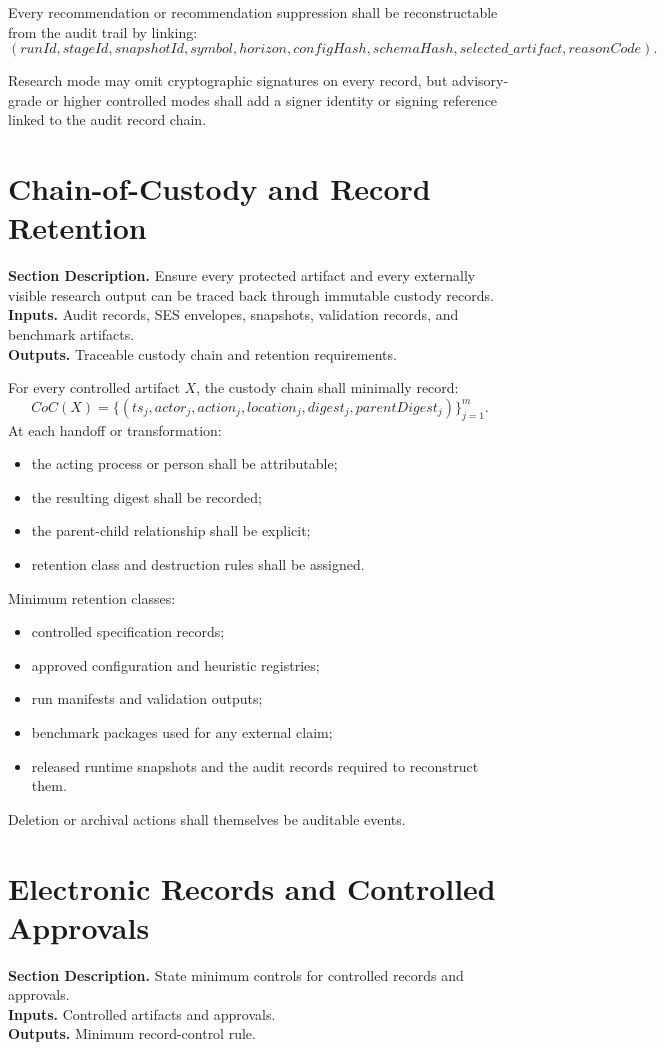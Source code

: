 \documentclass[11pt]{report}
\newcommand{\meta}[3]{\textbf{Section Description.} #1\\
\textbf{Inputs.} #2\\
\textbf{Outputs.} #3\par}
\begin{document}
Every recommendation or recommendation suppression shall be reconstructable from the audit trail by linking:
\[
(runId,stageId,snapshotId,symbol,horizon,configHash,schemaHash,selected\_artifact,reasonCode).
\]

Research mode may omit cryptographic signatures on every record, but advisory-grade or higher controlled modes shall add a signer identity or signing reference linked to the audit record chain.


\section{Chain-of-Custody and Record Retention}
\meta{Ensure every protected artifact and every externally visible research output can be traced back through immutable custody records.}{Audit records, SES envelopes, snapshots, validation records, and benchmark artifacts.}{Traceable custody chain and retention requirements.}

For every controlled artifact $X$, the custody chain shall minimally record:
\[
CoC(X)=\{(ts_j, actor_j, action_j, location_j, digest_j, parentDigest_j)\}_{j=1}^{m}.
\]
At each handoff or transformation:
\begin{itemize}
\item the acting process or person shall be attributable;
\item the resulting digest shall be recorded;
\item the parent-child relationship shall be explicit;
\item retention class and destruction rules shall be assigned.
\end{itemize}

Minimum retention classes:
\begin{itemize}
\item controlled specification records;
\item approved configuration and heuristic registries;
\item run manifests and validation outputs;
\item benchmark packages used for any external claim;
\item released runtime snapshots and the audit records required to reconstruct them.
\end{itemize}

Deletion or archival actions shall themselves be auditable events.

\section{Electronic Records and Controlled Approvals}
\meta{State minimum controls for controlled records and approvals.}{Controlled artifacts and approvals.}{Minimum record-control rule.}
\end{document}
